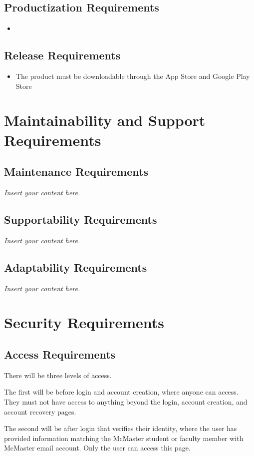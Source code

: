 \documentclass[12pt]{article}
\newcommand{\lips}{\textit{Insert your content here.}}
\begin{document}
\subsection{Productization Requirements}
\begin{itemize}
  \item
\end{itemize}

\subsection{Release Requirements}
\begin{itemize}
  \item The product must be downloadable through the App Store and Google Play Store
\end{itemize}

\section{Maintainability and Support Requirements}
\subsection{Maintenance Requirements}
\lips
\subsection{Supportability Requirements}
\lips
\subsection{Adaptability Requirements}
\lips

\section{Security Requirements}
\subsection{Access Requirements}

There will be three levels of access. 

The first will be before login and account creation, where anyone can access. They must not have access to anything beyond the login, account creation, and account recovery pages.

The second will be after login that verifies their identity, where the user has provided information matching the McMaster student or faculty member with McMaster email account. Only the user can access this page.
\end{document}
